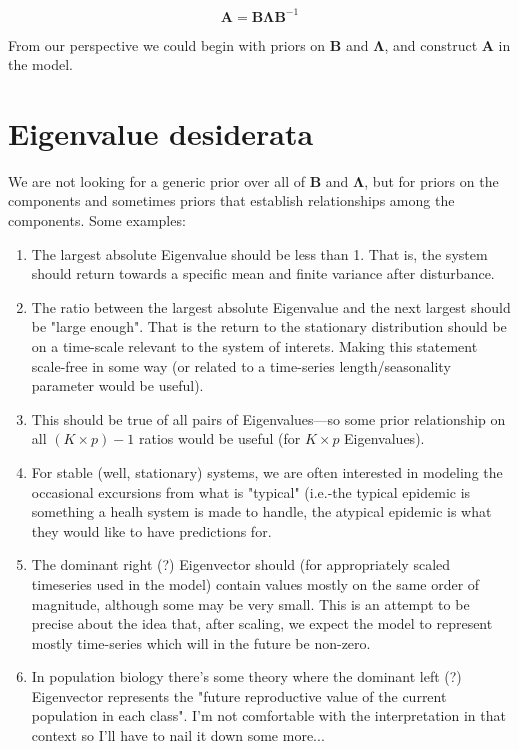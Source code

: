 \begin{equation}
\mathbf{A} = \mathbf{B} \mathbf{\Lambda} \mathbf{B}^{-1}
\end{equation}

From our perspective we could begin with priors on $\mathbf{B}$ and
$\mathbf{\Lambda}$, and construct $\mathbf{A}$ in the model.  

\section{Eigenvalue desiderata}
We are not looking for a generic prior over all of $\mathbf{B}$ and
$\mathbf{\Lambda}$, but for
priors on the components and sometimes priors that establish
relationships among the components.  Some examples:

\begin{enumerate}
\item The largest absolute Eigenvalue should be less than 1.  That is,
the system should return towards a specific mean and finite variance
after disturbance.
\item The ratio between the largest absolute Eigenvalue and the next
largest should be "large enough".  That is the return to the stationary 
distribution should be on a time-scale relevant to the system of interets.
Making this statement scale-free in some way (or related to a
time-series length/seasonality parameter would be useful).
\item This should be true of all pairs of Eigenvalues---so some prior
relationship on all $(K\times p)-1$ ratios would be useful (for $K\times
p$ Eigenvalues).
\item For stable (well, stationary) systems, we are often interested in modeling the
occasional excursions from what is "typical" (i.e.-the typical epidemic
is something a healh system is made to handle, the atypical epidemic is
what they would like to have predictions for.
\item The dominant right (?) Eigenvector should (for appropriately scaled
timeseries used in the model) contain values mostly on the same order of
magnitude, although some may be very small.  This is an attempt to be
precise about the idea that, after scaling, we expect the model to
represent mostly time-series which will in the future be non-zero. 
\item In population biology there's some theory where the dominant left (?)
Eigenvector represents the "future reproductive value of the current
population in each class".  I'm not comfortable with the interpretation
in that context so I'll have to nail it down some more...
\end{enumerate}


